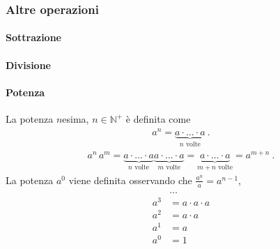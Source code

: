\documentclass[letterpaper,10pt,italian]{jupyterBook}
\begin{document}
\subsubsection{Altre operazioni}
\label{\detokenize{ch/set/numeric-sets:altre-operazioni}}

\paragraph{Sottrazione}
\label{\detokenize{ch/set/numeric-sets:sottrazione}}

\paragraph{Divisione}
\label{\detokenize{ch/set/numeric-sets:divisione}}

\paragraph{Potenza}
\label{\detokenize{ch/set/numeric-sets:potenza}}
\sphinxAtStartPar
La potenza \(n\)\sphinxhyphen{}esima, \(n \in \mathbb{N}^+\) è definita come
\begin{equation*}
\begin{split}a^n = \underbrace{a \cdot \dots \cdot a}_{n \text{ volte}} \ .\end{split}
\end{equation*}
\sphinxAtStartPar
{}
\begin{equation*}
\begin{split}a^n \, a^m = \underbrace{a \cdot \dots \cdot a}_{n \text{ volte}} \underbrace{a \cdot \dots \cdot a}_{m \text{ volte}} = 
 \underbrace{a \cdot \dots \cdot a}_{m+n \text{ volte}} = a^{m+n} \ .\end{split}
\end{equation*}
\sphinxAtStartPar
{} La potenza \(a^0\) viene definita osservando che \(\frac{a^n}{a} = a^{n-1}\),
\begin{equation*}
\begin{split}\begin{aligned}
& \dots \\
a^3 & = a \cdot a \cdot a \\
a^2 & = a \cdot a \\
a^1 & = a  \\
a^0 & = 1  \\
\end{aligned}\end{split}
\end{equation*}
\end{document}
